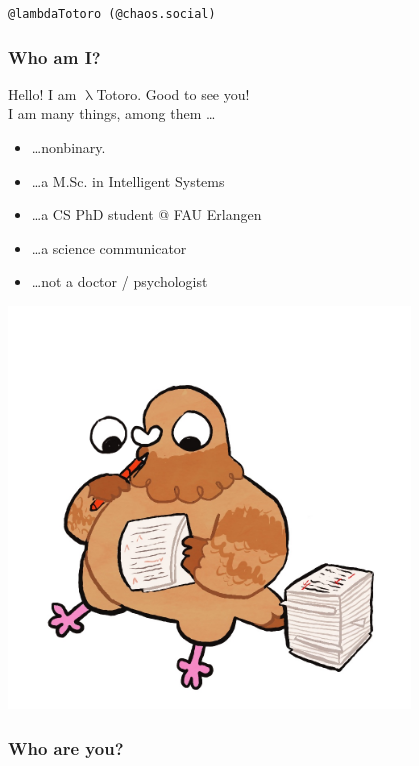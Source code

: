 \documentclass[aspectratio=169,x11names]{beamer}
\begin{document}
\begin{frame}
\begin{center}
\texttt{@lambdaTotoro (@chaos.social)}
\end{center}
\end{frame}

\begin{frame}
\frametitle{Who am I?}

\begin{minipage}{0.5\textwidth}
Hello! I am $\uplambda$Totoro. Good to see you!\\
I am many things, among them \dots
\medskip

\begin{itemize}
\item\dots nonbinary.
\item\dots a M.Sc. in Intelligent Systems
\item\dots a CS PhD student @ FAU Erlangen
\item\dots a science communicator
\item\dots not a doctor / psychologist
\end{itemize}
\end{minipage}%
\begin{minipage}{0.5\textwidth}
\begin{center}
\includegraphics[width=0.8\textwidth,keepaspectratio]{images/pigeon_jonas} 
\end{center}
\end{minipage}
\end{frame}

\begin{frame}
\frametitle{Who are you?}
\end{frame}
\end{document}
